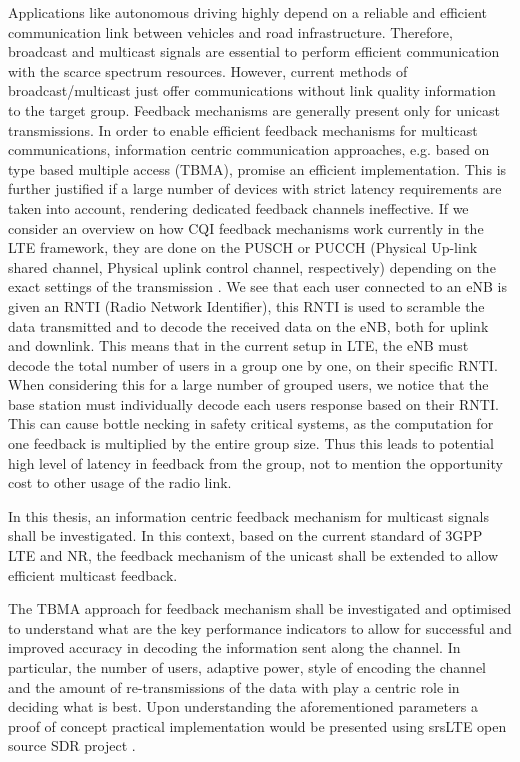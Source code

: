 \documentclass{article}
\begin{document}
Applications like autonomous driving highly depend on a reliable and efficient communication link between vehicles and road infrastructure. Therefore, broadcast and multicast signals are essential to perform efficient communication with the scarce spectrum resources. However, current methods of broadcast/multicast just offer communications without link quality information to the target group. Feedback mechanisms are generally present only for unicast transmissions. In order to enable efficient feedback mechanisms for multicast communications, information centric communication approaches, e.g. based on type based multiple access (TBMA)\cite{tbma}, promise an efficient implementation. This is further justified if a large number of devices with strict latency requirements are taken into account, rendering dedicated feedback channels ineffective. If we consider an overview on how CQI feedback mechanisms work currently in the LTE framework, they are done on the PUSCH or PUCCH (Physical Up-link shared channel, Physical uplink control channel, respectively) depending on the exact settings of the transmission \cite{ETSITS136213}. We see that each user connected to an eNB is given an RNTI (Radio Network Identifier), this RNTI is used to scramble the data transmitted and to decode the received data on the eNB, both for uplink and downlink. This means that in the current setup in LTE, the eNB must decode the total number of users in a group one by one, on their specific RNTI. When considering this for a large number of grouped users, we notice that the base station must individually decode each users response based on their RNTI. This can cause bottle necking in safety critical systems, as the computation for one feedback is multiplied by the entire group size. Thus this leads to potential high level of latency in feedback from the group, not to mention the opportunity cost to other usage of the radio link.

In this thesis, an information centric feedback mechanism for multicast signals shall be investigated. In this context, based on the current standard of 3GPP LTE \cite{3gpp36321} and NR\cite{3gpp38321}, the feedback mechanism of the unicast shall be extended to allow efficient multicast feedback.

The TBMA approach for feedback mechanism shall be investigated and optimised to understand what are the key performance indicators to allow for successful and improved accuracy in decoding the information sent along the channel. In particular, the number of users, adaptive power, style of encoding the channel and the amount of re-transmissions of the data with play a centric role in deciding what is best. Upon understanding the aforementioned parameters a proof of concept practical implementation would be presented using srsLTE open source SDR project \cite{tbma}. 
\end{document}
